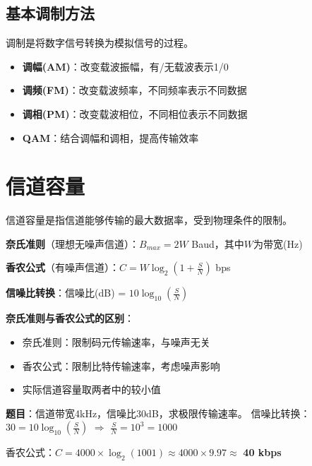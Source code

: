 \subsection{基本调制方法}
调制是将数字信号转换为模拟信号的过程。

\begin{itemize}[leftmargin=2em,itemsep=0pt]
    \item \textbf{调幅(AM)}：改变载波振幅，有/无载波表示1/0
    \item \textbf{调频(FM)}：改变载波频率，不同频率表示不同数据
    \item \textbf{调相(PM)}：改变载波相位，不同相位表示不同数据
    \item \textbf{QAM}：结合调幅和调相，提高传输效率
\end{itemize}

\section{信道容量}
信道容量是指信道能够传输的最大数据率，受到物理条件的限制。

\begin{formulabox}
\textbf{奈氏准则}（理想无噪声信道）：$B_{max} = 2W$ Baud，其中$W$为带宽(Hz)

\textbf{香农公式}（有噪声信道）：$C = W \log_2(1 + \frac{S}{N})$ bps

\textbf{信噪比转换}：信噪比(dB) = $10\log_{10}(\frac{S}{N})$
\end{formulabox}

\begin{notebox}
\textbf{奈氏准则与香农公式的区别}：
\begin{itemize}[itemsep=0pt]
    \item 奈氏准则：限制码元传输速率，与噪声无关
    \item 香农公式：限制比特传输速率，考虑噪声影响
    \item 实际信道容量取两者中的较小值
\end{itemize}
\end{notebox}

\begin{examplebox}[例题2.1 信道容量计算]
\textbf{题目}：信道带宽4kHz，信噪比30dB，求极限传输速率。
\tcblower
信噪比转换：$30 = 10\log_{10}(\frac{S}{N})$ $\Rightarrow$ $\frac{S}{N} = 10^3 = 1000$

香农公式：$C = 4000 \times \log_2(1001) \approx 4000 \times 9.97 \approx$ \textbf{40 kbps}
\end{examplebox}


